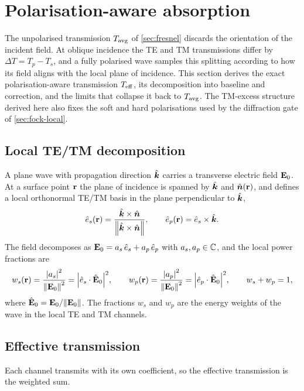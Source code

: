 \section{Polarisation-aware absorption}\label{sec:pol}

The unpolarised transmission $T_{\mathrm{avg}}$ of \cref{sec:fresnel} discards the
orientation of the incident field. At oblique incidence the TE and TM
transmissions differ by $\Delta T = T_p-T_s$, and a fully polarised wave samples
this splitting according to how its field aligns with the local plane of
incidence. This section derives the exact polarisation-aware transmission
$T_{\mathrm{eff}}$, its decomposition into baseline and correction, and the limits that
collapse it back to $T_{\mathrm{avg}}$. The TM-excess structure derived here also fixes the
soft and hard polarisations used by the diffraction gate of \cref{sec:fock-local}.

\subsection{Local TE/TM decomposition}\label{sec:te-tm}

A plane wave with propagation direction $\hat{\bm{k}}$ carries a transverse electric
field $\mathbf{E}_0$. At a surface point $\mathbf{r}$ the plane of incidence is spanned by
$\hat{\bm{k}}$ and $\hat{\bm{n}}(\mathbf{r})$, and defines a local orthonormal TE/TM basis in the
plane perpendicular to $\hat{\bm{k}}$,
\begin{equation}\label{eq:es-ep}
  \hat{e}_s(\mathbf{r}) = \frac{\hat{\bm{k}}\times\hat{\bm{n}}}{\norm{\hat{\bm{k}}\times\hat{\bm{n}}}},
  \qquad
  \hat{e}_p(\mathbf{r}) = \hat{e}_s\times\hat{\bm{k}}.
\end{equation}
The field decomposes as $\mathbf{E}_0 = a_s\,\hat{e}_s + a_p\,\hat{e}_p$ with
$a_s,a_p\in\mathbb{C}$, and the local power fractions are
\begin{equation}\label{eq:ws-wp}
  w_s(\mathbf{r}) = \frac{\abs{a_s}^2}{\norm{\mathbf{E}_0}^2}
  = \abs{\hat{e}_s\cdot\hat{\mathbf{E}}_0}^2,
  \qquad
  w_p(\mathbf{r}) = \frac{\abs{a_p}^2}{\norm{\mathbf{E}_0}^2}
  = \abs{\hat{e}_p\cdot\hat{\mathbf{E}}_0}^2,
  \qquad w_s+w_p=1,
\end{equation}
where $\hat{\mathbf{E}}_0=\mathbf{E}_0/\norm{\mathbf{E}_0}$. The fractions $w_s$ and $w_p$ are the
energy weights of the wave in the local TE and TM channels.

\subsection{Effective transmission}\label{sec:Teff}

Each channel transmits with its own coefficient, so the effective transmission
is the weighted sum.

